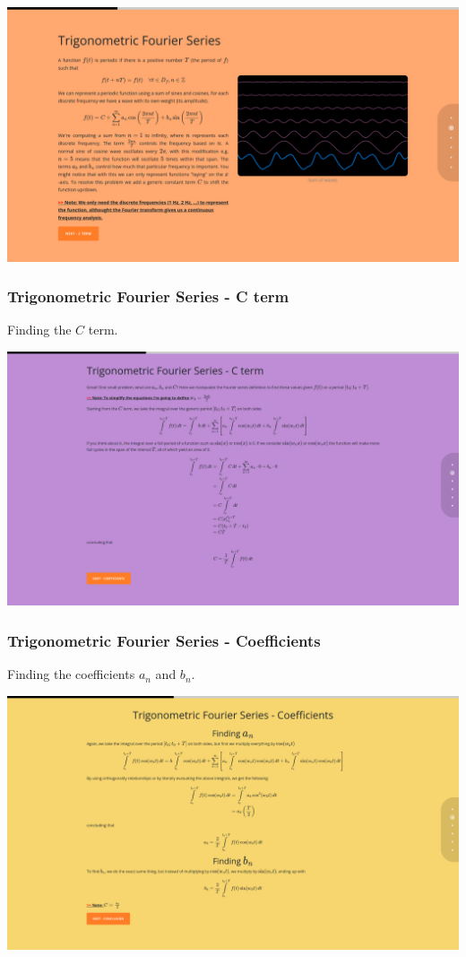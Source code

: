 \documentclass{article}
\begin{document}
\includegraphics[width=\textwidth]{chap5.png}

\subsubsection{Trigonometric Fourier Series - C term}

Finding the \(C\) term.

\includegraphics[width=\textwidth]{chap6.png}

\subsubsection{Trigonometric Fourier Series - Coefficients}

Finding the coefficients \(a_n\) and \(b_n\).

\includegraphics[width=\textwidth]{chap7.png}
\end{document}

